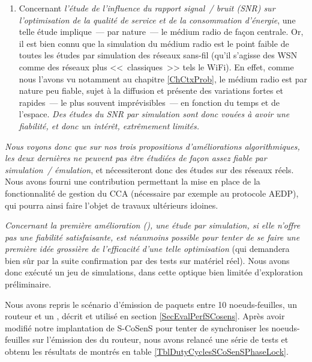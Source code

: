 \begin{enumerate}
\item Concernant \emph{l'étude de l'influence du rapport signal~/ bruit
(SNR) sur l'optimisation de la qualité de service et de la consommation
d'énergie}, une telle étude implique~--- par nature~--- le médium radio
de façon centrale. Or, il est bien connu que la simulation du médium radio
est le point faible de toutes les études par simulation des réseaux
sans-fil (qu'il s'agisse des WSN comme des réseaux plus <<~classiques~>>
tels le WiFi). En effet, comme nous l'avons vu notamment au chapitre
\ref{ChCtxProb}, le médium radio est par nature peu fiable, sujet à la
diffusion et présente des variations fortes et rapides~--- le plus souvent
imprévisibles~--- en fonction du temps et de l'espace. \emph{Des études
du SNR par simulation sont donc vouées à avoir une fiabilité, et donc
un intérêt, extrêmement limités.}

\end{enumerate}

\smallskip

\emph{Nous voyons donc que sur nos trois propositions d'améliorations
algorithmiques, les deux dernières ne peuvent pas être étudiées de façon
assez fiable par simulation~/ émulation}, et nécessiteront donc des études
sur des réseaux réels. Nous avons fourni une contribution permettant la mise
en place de la fonctionnalité de gestion du CCA \cite{PRriotEnh13}
(nécessaire par exemple au protocole AEDP), qui pourra ainsi faire
l'objet de travaux ultérieurs idoines.

\smallskip

\emph{Concernant la première amélioration (), une
étude par simulation, si elle n'offre pas une fiabilité satisfaisante,
est néanmoins possible pour tenter de se faire une première idée grossière
de l'efficacité d'une telle optimisation} (qui demandera bien sûr par la
suite confirmation par des tests sur matériel réel). Nous avons donc exécuté
un jeu de simulations, dans cette optique bien limitée d'exploration
préliminaire.

Nous avons repris le scénario d'émission de paquets entre 10 noeuds-feuilles,
un routeur et un , décrit et utilisé en section
\vref{SecEvalPerfSCosens}. Après avoir modifié notre implantation
de S-CoSenS pour tenter de synchroniser les noeuds-feuilles sur l'émission
des  du routeur, nous avons relancé une série de tests et
obtenu les résultats de  montrés en table
\vref{TblDutyCyclesSCoSenSPhaseLock}.


